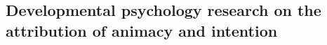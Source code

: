\documentclass{frontiersSCNS} %
\begin{document}













\subsection{Developmental psychology research on the attribution of animacy and intention}
\label{sec:developmental-expl}
\end{document}
